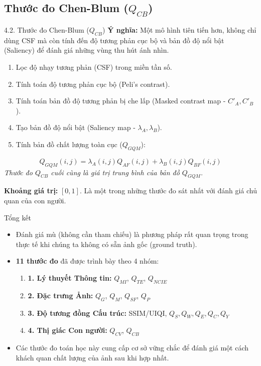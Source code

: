 \documentclass{beamer}
\begin{document}
\subsection{Thước đo Chen-Blum ($Q_{CB}$)}
\begin{frame}{4.2. Thước đo Chen-Blum ($Q_{CB}$)}
    \textbf{Ý nghĩa:} Một mô hình tiên tiến hơn, không chỉ dùng CSF mà còn tính đến độ tương phản cục bộ và bản đồ độ nổi bật (Saliency) để đánh giá những vùng thu hút ánh nhìn.
    \begin{enumerate}
        \item Lọc độ nhạy tương phản (CSF) trong miền tần số.
        \item Tính toán độ tương phản cục bộ (Peli's contrast).
        \item Tính toán bản đồ độ tương phản bị che lấp (Masked contrast map - $C'_A, C'_B$).
        \item Tạo bản đồ độ nổi bật (Saliency map - $\lambda_A, \lambda_B$).
        \item Tính bản đồ chất lượng toàn cục ($Q_{GQM}$):
    \end{enumerate}

    \begin{equation}
        Q_{GQM}(i,j) = \lambda_A(i,j)Q_{AF}(i,j) + \lambda_B(i,j)Q_{BF}(i,j)
    \end{equation}
    \textit{Thước đo $Q_{CB}$ cuối cùng là giá trị trung bình của bản đồ $Q_{GQM}$.}

    \vspace{0.3cm}
    \textbf{Khoảng giá trị:} $[0, 1]$. Là một trong những thước đo sát nhất với đánh giá chủ quan của con người.
\end{frame}


\begin{frame}{Tổng kết}
    \begin{itemize}
        \item Đánh giá mù (không cần tham chiếu) là phương pháp rất quan trọng trong thực tế khi chúng ta không có sẵn ảnh gốc (ground truth).
        \item \textbf{11 thước đo} đã được trình bày theo 4 nhóm:
        \begin{enumerate}
            \item \textbf{1. Lý thuyết Thông tin:} $Q_{MI}$, $Q_{TE}$, $Q_{NCIE}$
            \item \textbf{2. Đặc trưng Ảnh:} $Q_G$, $Q_M$, $Q_{SF}$, $Q_P$
            \item \textbf{3. Độ tương đồng Cấu trúc:} SSIM/UIQI, $Q_S, Q_W, Q_E, Q_{C}, Q_Y$
            \item \textbf{4. Thị giác Con người:} $Q_{CV}$, $Q_{CB}$
        \end{enumerate}
        \item Các thước đo toán học này cung cấp cơ sở vững chắc để đánh giá một cách khách quan chất lượng của ảnh sau khi hợp nhất.
    \end{itemize}
\end{frame}
\end{document}
